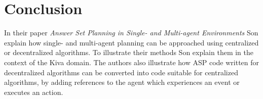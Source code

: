 \documentclass[runningheads]{llncs}
\newcommand{\papertitle}{Answer Set Planning in Single- and Multi-agent Environments}
\newcommand{\authorquote}{Son \etal}
\begin{document}
\section{Conclusion} \label{8:sec:conclusion}

In their paper \textit{\papertitle{}} \authorquote{} explain how single- and multi-agent planning can be approached using centralized or decentralized algorithms. To illustrate their methods \authorquote{} explain them in the context of the Kiva domain. The authors also illustrate how ASP code written for decentralized algorithms can be converted into code suitable for centralized algorithms, by adding references to the agent which experiences an event or executes an action.


    



\end{document}
